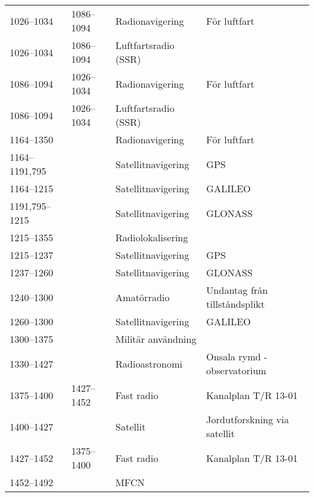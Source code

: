 \begin{landscape}
\begin{longtable}{llll}
	1026--1034         & 1086--1094         & Radionavigering         & För luftfart                             \\
	1026--1034         & 1086--1094         & Luftfartsradio (SSR)    &  \\
	1086--1094         & 1026--1034         & Radionavigering         & För luftfart                             \\
	1086--1094         & 1026--1034         & Luftfartsradio (SSR)    &  \\
	1164--1350         &                    & Radionavigering         & För luftfart                             \\
	1164--1191,795     &                    & Satellitnavigering      & GPS                                      \\
	1164--1215         &                    & Satellitnavigering      & GALILEO                                  \\
	1191,795--1215     &                    & Satellitnavigering      & GLONASS                                  \\
	1215--1355         &                    & Radiolokalisering       &  \\
	1215--1237         &                    & Satellitnavigering      & GPS                                      \\
	1237--1260         &                    & Satellitnavigering      & GLONASS                                  \\
	1240--1300         &                    & Amatörradio             & Undantag från tillståndsplikt            \\
	1260--1300         &                    & Satellitnavigering      & GALILEO                                  \\
	1300--1375         &                    & Militär användning      &  \\
	1330--1427         &                    & Radioastronomi          & Onsala rymd - observatorium              \\
	1375--1400         & 1427--1452         & Fast radio              & Kanalplan T/R 13-01                      \\
	1400--1427         &                    & Satellit                & Jordutforskning via satellit             \\
	1427--1452         & 1375--1400         & Fast radio              & Kanalplan T/R 13-01                      \\
	1452--1492         &                    & MFCN                    &  \\

\end{longtable}
\end{landscape}
